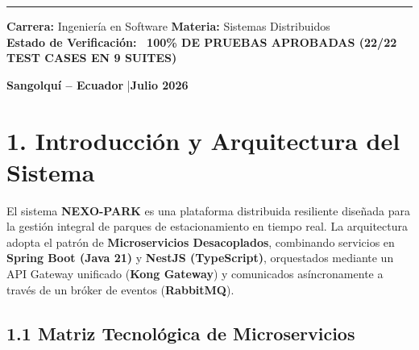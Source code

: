 \documentclass[11pt,a4paper]{article}
\begin{document}
\begin{titlepage}
\begin{center}
\begin{tcolorbox}[
        enhanced,
        colback=brandSurface,
        colframe=brandTeal,
        arc=14pt,
        width=0.92\textwidth,
        boxrule=1.5pt,
        shadow={0mm}{4mm}{15mm}{black!12}
    ]
        \vspace{0.5cm}
        \textcolor{brandSoft}{\rule{0.85\textwidth}{1pt}}
        \vspace{0.3cm}

        {\small \textbf{Carrera:} Ingeniería en Software \qquad \textbf{Materia:} Sistemas Distribuidos} \\
        \vspace{0.15cm}
        {\small \textbf{Estado de Verificación:} \textcolor{brandTeal}{\textbf{\textbullet~100\% DE PRUEBAS APROBADAS (22/22 TEST CASES EN 9 SUITES)}}}
        \vspace{0.1cm}
    \end{tcolorbox}

    \vfill

    {\small \textcolor{brandMuted}{\textbf{Sangolquí -- Ecuador} \quad|\quad \textbf{Julio 2026}}}

\end{center}
\end{titlepage}

\nopagecolor
\color{brandInk}


\section{1. Introducción y Arquitectura del Sistema}
El sistema \textbf{NEXO-PARK} es una plataforma distribuida resiliente diseñada para la gestión integral de parques de estacionamiento en tiempo real. La arquitectura adopta el patrón de \textbf{Microservicios Desacoplados}, combinando servicios en \textbf{Spring Boot (Java 21)} y \textbf{NestJS (TypeScript)}, orquestados mediante un API Gateway unificado (\textbf{Kong Gateway}) y comunicados asíncronamente a través de un bróker de eventos (\textbf{RabbitMQ}).

\subsection{1.1 Matriz Tecnológica de Microservicios}
\end{document}
